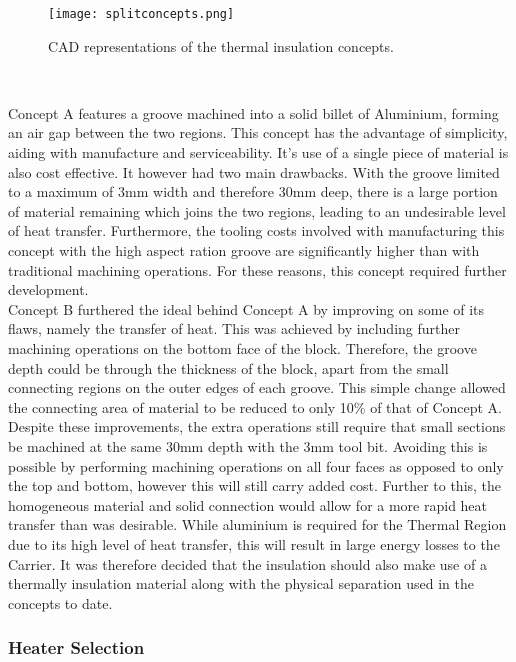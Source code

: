 \begin{figure}[!htb]
	\centering
	\texttt{[image: splitconcepts.png]}
	\caption[Thermal Insulation Concepts.]{CAD representations of the thermal insulation concepts.}
	\label{fig:splitconcepts}
\end{figure} 
\FloatBarrier

Concept A features a groove machined into a solid billet of Aluminium, forming an air gap between the two regions. This concept has the advantage of simplicity, aiding with manufacture and serviceability. It's use of a single piece of material is also cost effective. It however had two main drawbacks. With the groove limited to a maximum of 3mm width and therefore 30mm deep, there is a large portion of material remaining which joins the two regions, leading to an undesirable level of heat transfer. Furthermore, the tooling costs involved with manufacturing this concept with the high aspect ration groove are significantly higher than with traditional machining operations. For these reasons, this concept required further development.\\

Concept B furthered the ideal behind Concept A by improving on some of its flaws, namely the transfer of heat. This was achieved by including further machining operations on the bottom face of the block. Therefore, the groove depth could be through the thickness of the block, apart from the small connecting regions on the outer edges of each groove. This simple change allowed the connecting area of material to be reduced to only 10\% of that of Concept A. Despite these improvements, the extra operations still require that small sections be machined at the same 30mm depth with the 3mm tool bit. Avoiding this is possible by performing machining operations on all four faces as opposed to only the top and bottom, however this will still carry added cost. Further to this, the homogeneous material and solid connection would allow for a more rapid heat transfer than was desirable. While aluminium is required for the Thermal Region due to its high level of heat transfer, this will result in large energy losses to the Carrier. It was therefore decided that the insulation should also make use of a thermally insulation material along with the physical separation used in the concepts to date.\\



\subsubsection{Heater Selection}

